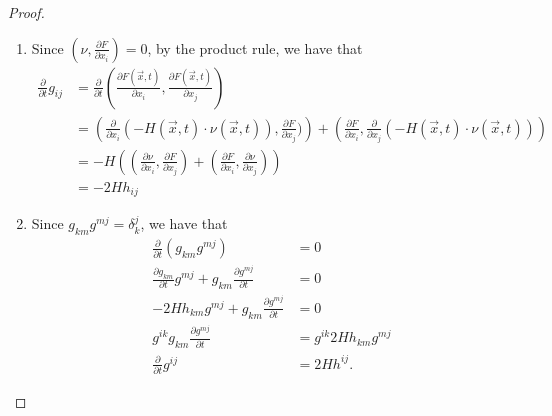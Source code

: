\documentclass[a4paper]{report}
\theoremstyle{remark}
\begin{document}
\begin{proof}
	\begin{enumerate}
		\item Since $\left( \nu ,\frac{\partial F}{\partial x_{i}}  \right) =0$, by the product rule, we have that
		      \begin{equation*}
			      \begin{split}
				      \frac{\partial }{\partial t} g_{ij}^{}
				      & = \frac{\partial }{\partial t} \left( \frac{\partial F(\vec{x},t) }{\partial x_{i}} , \frac{\partial F(\vec{x},t) }{\partial x_{j }}  \right)                                                                                                               \\
				      & = \left( \frac{\partial }{\partial x_{i}} (-H (\vec{x},t) \cdot \nu (\vec{x},t)) , \frac{\partial F}{\partial x_{j}} ) \right) + \left( \frac{\partial F}{\partial x_{i}}, \frac{\partial }{\partial x_{j}} (-H (\vec{x},t) \cdot \nu (\vec{x},t))  \right) \\
				      & = -H(\left( \frac{\partial \nu }{\partial x_{i}} , \frac{\partial F}{\partial x_{j}}  \right) + \left( \frac{\partial F}{\partial x_{i}} , \frac{\partial \nu }{\partial x_{j}}  \right) )                                                                  \\
				      & = -2H h_{ij}^{}
			      \end{split}
		      \end{equation*}
		\item Since $g_{km}^{} g_{}^{mj} = \delta_{k}^{j} $, we have that
		      \begin{align*}
			      \frac{\partial }{\partial t} (g_{km}^{} g_{}^{mj})                                                  & =0                                \\
			      \frac{\partial g_{km}^{} }{\partial t} g_{}^{mj} + g_{km}^{} \frac{\partial g_{}^{mj} }{\partial t} & =0                                \\
			      -2H h_{km}^{} g_{}^{mj} + g_{km}^{} \frac{\partial g_{}^{mj} }{\partial t}                          & =0                                \\
			      g_{}^{ik} g_{km}^{} \frac{\partial g_{}^{mj} }{\partial t}                                          & =g_{}^{ik} 2H h_{km}^{} g_{}^{mj} \\
			      \frac{\partial }{\partial t} g_{}^{ij}                                                              & = 2H h_{}^{ij}.
		      \end{align*}

\end{enumerate}
\end{proof}
\end{document}
